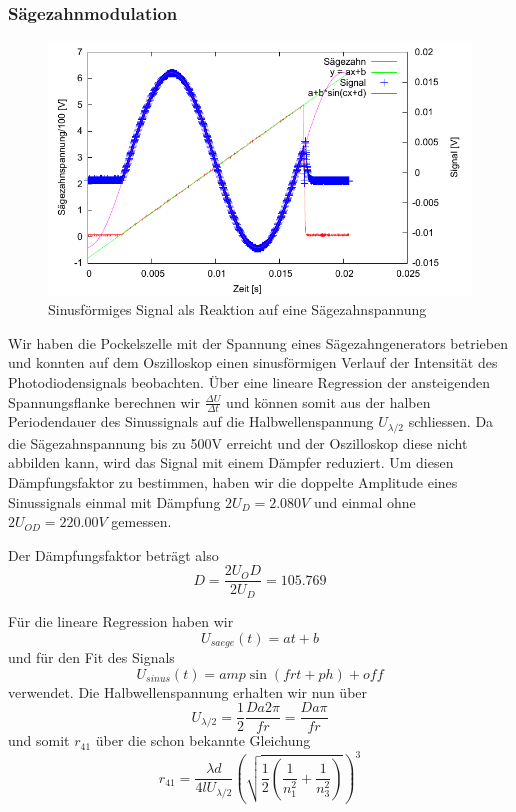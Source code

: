 \subsubsection{Sägezahnmodulation}

\begin{figure}[H]
 \centering
 \includegraphics{messwerte/saegezahn/saegezahn_1.pdf}
 \caption{Sinusförmiges Signal als Reaktion auf eine Sägezahnspannung}
\end{figure}

Wir haben die Pockelszelle mit der Spannung eines Sägezahngenerators betrieben und konnten auf dem Oszilloskop einen sinusförmigen Verlauf der Intensität des Photodiodensignals beobachten. Über eine lineare Regression der ansteigenden Spannungsflanke berechnen wir $\frac{\Delta U}{\Delta t}$ und können somit aus der halben Periodendauer des Sinussignals auf die Halbwellenspannung $U_{\lambda/2}$ schliessen. Da die Sägezahnspannung bis zu 500V erreicht und der Oszilloskop diese nicht abbilden kann, wird das Signal mit einem Dämpfer reduziert. Um diesen Dämpfungsfaktor zu bestimmen, haben wir die doppelte Amplitude eines Sinussignals einmal mit Dämpfung $2U_D = 2.080V$ und einmal ohne $2U_{OD} = 220.00V$ gemessen.

Der Dämpfungsfaktor beträgt also
$$ D = \frac{2U_OD}{2U_{D}} = 105.769 $$

Für die lineare Regression haben wir
$$ U_{saege}(t) = a  t + b $$
und für den Fit des Signals
$$ U_{sinus}(t) = \mathit{amp}  \sin(\mathit{fr} t + \mathit{ph}) + \mathit{off} $$
verwendet. Die Halbwellenspannung erhalten wir nun über
$$ U_{\lambda/2} = \frac{1}{2}\frac{D a 2 \pi}{ fr} =  \frac{D a \pi}{fr} $$
und somit $r_{41}$ über die schon bekannte Gleichung
$$ r_{41} = \frac{\lambda d}{4l U_{\lambda / 2}} \left(  \sqrt{\frac{1}{2} \left( \frac{1}{n_1^2} + \frac{1}{n_3^2} \right)} \right)^3 $$


